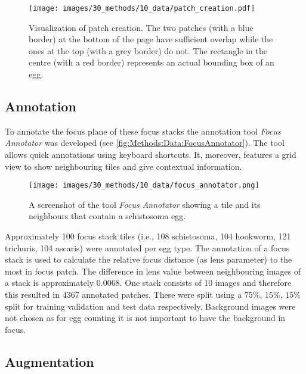 \begin{figure}
    \centering
    \texttt{[image: images/30\_methods/10\_data/patch\_creation.pdf]}
    \caption{Visualization of patch creation. The two patches (with a blue border) at the bottom of the page have sufficient overlap while the ones at the top (with a grey border) do not. The rectangle in the centre (with a red border) represents an actual bounding box of an egg.}
    \label{fig:Methods:Data:PatchCreation}
\end{figure}

\subsection{Annotation}
\label{sec:Methods:Data:Annotation}

To annotate the focus plane of these focus stacks the annotation tool \emph{Focus Annotator} \cite{kuchelmeister2022focus} was developed (see \autoref{fig:Methods:Data:FocusAnnotator}). The tool allows quick annotations using keyboard shortcuts. It, moreover, features a grid view to show neighbouring tiles and give contextual information.

\begin{figure}
    \centering
    \texttt{[image: images/30\_methods/10\_data/focus\_annotator.png]}
    \caption{A screenshot of the tool \emph{Focus Annotator} showing a tile and its neighbours that contain a schistosoma egg.}
    \label{fig:Methods:Data:FocusAnnotator}
\end{figure}


Approximately 100 focus stack tiles (i.e., 108 schistosoma, 104 hookworm, 121 trichuris, 104 ascaris) were annotated per egg type. The annotation of a focus stack is used to calculate the relative focus distance (as lens parameter) to the most in focus patch. The difference in lens value between neighbouring images of a stack is approximately $0.0068$.  One stack consists of 10 images and therefore this resulted in 4367 annotated patches. These were split using a $75\%$, $15\%$, $15\%$ split for training validation and test data respectively. Background images were not chosen as for egg counting it is not important to have the background in focus.

\subsection{Augmentation}
\label{sec:Methods:Data:Augmentation}

